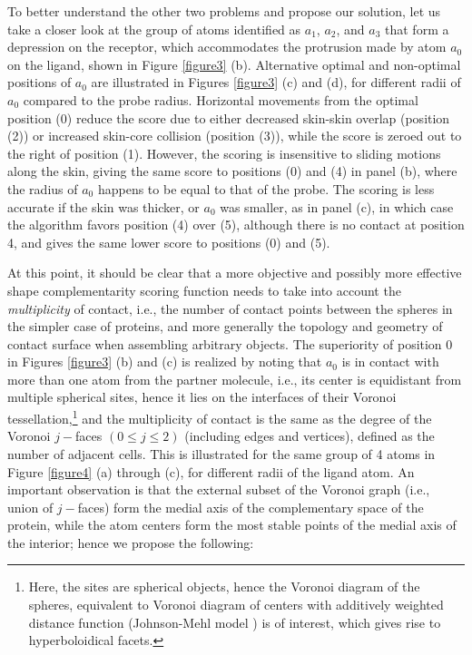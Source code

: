 \documentclass[article]{gmp2014}
\theoremstyle{definition}
\begin{document}
To better understand the other two problems and propose our solution, let us take a closer look at the group of atoms identified as $a_1$, $a_2$, and $a_3$ that form a depression on the receptor, which accommodates the protrusion made by atom $a_0$ on the ligand, shown in Figure \ref{figure3} (b). Alternative optimal and non-optimal positions of $a_0$ are illustrated in Figures \ref{figure3} (c) and (d), for different radii of $a_0$ compared to the probe radius. Horizontal movements from the optimal position (0) reduce the score due to either decreased skin-skin overlap (position (2)) or increased skin-core collision (position (3)), while the score is zeroed out to the right of position (1). However, the scoring is insensitive to sliding motions along the skin, giving the same score to positions (0) and (4) in panel (b), where the radius of $a_0$ happens to be equal to that of the probe. The scoring is less accurate if the skin was thicker, or $a_0$ was smaller, as in panel (c), in which case the algorithm favors position (4) over (5), although there is no contact at position 4, and gives the same lower score to positions (0) and (5).

At this point, it should be clear that a more objective and possibly more effective shape complementarity scoring function needs to take into account the {\it multiplicity} of contact, i.e., the number of contact points between the spheres in the simpler case of proteins, and more generally the topology and geometry of contact surface when assembling arbitrary objects. The superiority of position 0 in Figures \ref{figure3} (b) and (c) is realized by noting that $a_0$ is in contact with more than one atom from the partner molecule, i.e., its center is equidistant from multiple spherical sites, hence it lies on the interfaces of their Voronoi tessellation,\footnote{Here, the sites are spherical objects, hence the Voronoi diagram of the spheres, equivalent to Voronoi diagram of centers with additively weighted distance function (Johnson-Mehl model \cite{Johnson1939}) is of interest, which gives rise to hyperboloidical facets.}
%
and the multiplicity of contact is the same as the degree of the Voronoi $j-$faces $(0 \leq j \leq 2)$ (including edges and vertices), defined as the number of adjacent cells. This is illustrated for the same group of 4 atoms in Figure \ref{figure4} (a) through (c), for different radii of the ligand atom. An important observation is that the external subset of the Voronoi graph (i.e., union of $j-$faces) form the medial axis of the complementary space of the protein, while the atom centers form the most stable points of the medial axis of the interior; hence we propose the following:
\end{document}
